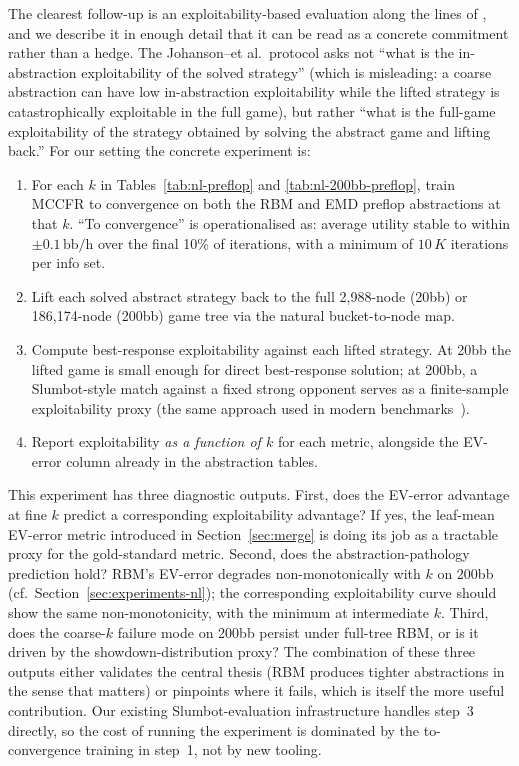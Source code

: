 \documentclass[11pt]{article}
\begin{document}
The clearest follow-up is an
exploitability-based evaluation along the lines of
\citet{johanson2013evaluating}, and we describe it in enough detail
that it can be read as a concrete commitment rather than a hedge.
The Johanson--et al.\ protocol asks not ``what is the in-abstraction
exploitability of the solved strategy'' (which is misleading: a
coarse abstraction can have low in-abstraction exploitability while
the lifted strategy is catastrophically exploitable in the full
game), but rather ``what is the full-game exploitability of the
strategy obtained by solving the abstract game and lifting back.''
For our setting the concrete experiment is:

\begin{enumerate}[nosep]
\item For each $k$ in Tables~\ref{tab:nl-preflop} and
  \ref{tab:nl-200bb-preflop}, train MCCFR to convergence on both the
  RBM and EMD preflop abstractions at that $k$. ``To convergence''
  is operationalised as: average utility stable to within $\pm
  0.1\,\mathrm{bb/h}$ over the final 10\% of iterations, with a
  minimum of $10\,K$ iterations per info set.
\item Lift each solved abstract strategy back to the full 2,988-node
  (20bb) or 186{,}174-node (200bb) game tree via the natural
  bucket-to-node map.
\item Compute best-response exploitability against each lifted
  strategy. At 20bb the lifted game is small enough for direct
  best-response solution; at 200bb, a Slumbot-style match against a
  fixed strong opponent serves as a finite-sample
  exploitability proxy (the same approach used in modern
  benchmarks~\citep{brown2018superhuman}).
\item Report exploitability \emph{as a function of $k$} for each
  metric, alongside the EV-error column already in the abstraction
  tables.
\end{enumerate}

This experiment has three diagnostic outputs. First, does the
EV-error advantage at fine $k$ predict a corresponding exploitability
advantage? If yes, the leaf-mean EV-error metric introduced in
Section~\ref{sec:merge} is doing its job as a tractable proxy for
the gold-standard metric. Second, does the abstraction-pathology
prediction hold? RBM's EV-error degrades non-monotonically with $k$
on 200bb (cf.\ Section~\ref{sec:experiments-nl}); the corresponding
exploitability curve should show the same non-monotonicity, with the
minimum at intermediate $k$. Third, does the coarse-$k$ failure
mode on 200bb persist under full-tree RBM, or is it driven by the
showdown-distribution proxy? The combination of these three outputs
either validates the central thesis (RBM produces tighter
abstractions in the sense that matters) or pinpoints where it fails,
which is itself the more useful contribution. Our existing
Slumbot-evaluation infrastructure handles step~3 directly, so the
cost of running the experiment is dominated by the to-convergence
training in step~1, not by new tooling.
\end{document}
